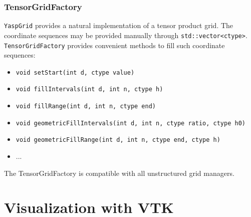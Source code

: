 \documentclass[ignorenonframetext,11pt]{beamer}
\theoremstyle{definition}
\begin{document}
\begin{frame}
 \frametitle{TensorGridFactory}

 \lstinline!YaspGrid! provides a natural implementation of a tensor product grid.
 The coordinate sequences may be provided manually through \lstinline!std::vector<ctype>!.
 \lstinline!TensorGridFactory! provides convenient methods to fill such coordinate sequences:
 \begin{itemize}
  \item \lstinline!void setStart(int d, ctype value)!
  \item \lstinline!void fillIntervals(int d, int n, ctype h)!
  \item \lstinline!void fillRange(int d, int n, ctype end)!
  \item \lstinline!void geometricFillIntervals(int d, int n, ctype ratio, ctype h0)!
  \item \lstinline!void geometricFillRange(int d, int n, ctype end, ctype h)!
  \item ...
 \end{itemize}

 The TensorGridFactory is compatible with all unstructured grid managers.
\end{frame}

\section{Visualization with VTK}
\end{document}

